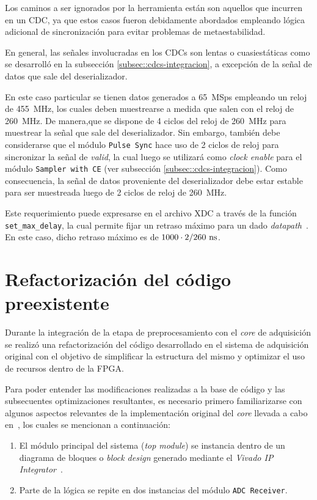 \documentclass[../../main.tex]{subfiles}
\begin{document}
Los caminos a ser ignorados por la herramienta están son aquellos que incurren en un CDC, ya que estos casos fueron debidamente abordados empleando lógica adicional de sincronización para evitar problemas de metaestabilidad. 

En general, las señales involucradas en los CDCs son lentas o cuasiestáticas como se desarrolló en la subsección \ref{subsec::cdcs-integracion}, a excepción de la señal de datos que sale del deserializador. 

En este caso particular se tienen datos generados a 65~MSps empleando un reloj de 455~MHz, los cuales deben muestrearse a medida que salen con el reloj de 260~MHz. De manera,que se dispone de 4 ciclos del reloj de 260~MHz para muestrear la señal que sale del deserializador. Sin embargo, también debe considerarse que el módulo \texttt{Pulse Sync} hace uso de 2 ciclos de reloj para sincronizar la señal de \textit{valid}, la cual luego se utilizará como \textit{clock enable} para el módulo \texttt{Sampler with CE} (ver subsección \ref{subsec::cdcs-integracion}). Como consecuencia, la señal de datos proveniente del deserializador debe estar estable para ser muestreada luego de 2 ciclos de reloj de 260~MHz.

Este requerimiento puede expresarse en el archivo XDC a través de la función \texttt{set\_max\_delay}, la cual permite fijar un retraso máximo para un dado \textit{datapath}~\cite{set-max-delay}. En este caso, dicho retraso máximo es de $1000 \cdot 2/260~\textrm{ns}$.

\section{Refactorización del código preexistente}
Durante la integración de la etapa de preprocesamiento con el \textit{core} de adquisición se realizó una refactorización del código desarrollado en el sistema de adquisición original con el objetivo de simplificar la estructura del mismo y optimizar el uso de recursos dentro de la FPGA.

Para poder entender las modificaciones realizadas a la base de código y las subsecuentes optimizaciones resultantes, es necesario primero familiarizarse con algunos aspectos relevantes de la implementación original del \textit{core} llevada a cabo en~\cite{proyecto-jose}, los cuales se mencionan a continuación:
\begin{enumerate}
    \item El módulo principal del sistema (\textit{top module}) se instancia dentro de un diagrama de bloques o \textit{block design} generado mediante el \textit{Vivado IP Integrator}~\cite{vivado-ip-integrator}.
    \item Parte de la lógica se repite en dos instancias del módulo \texttt{ADC Receiver}.
\end{enumerate}
\end{document}
